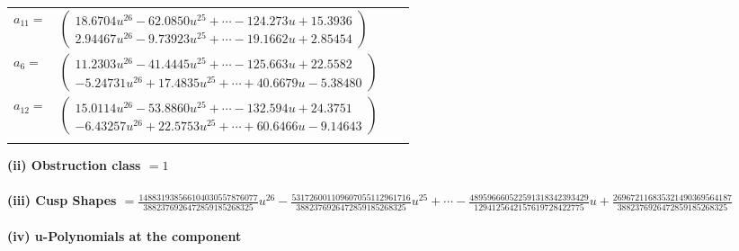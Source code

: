 \documentclass[1p]{elsarticle_modified}
\theoremstyle{definition}
\begin{document}
\begin{tabular}{m{7pt} m{180pt} m{7pt} m{180pt} }
\flushright $a_{11}=$&$\begin{pmatrix}18.6704 u^{26}-62.0850 u^{25}+\cdots-124.273 u+15.3936\\2.94467 u^{26}-9.73923 u^{25}+\cdots-19.1662 u+2.85454\end{pmatrix}$ \\
\flushright $a_{6}=$&$\begin{pmatrix}11.2303 u^{26}-41.4445 u^{25}+\cdots-125.663 u+22.5582\\-5.24731 u^{26}+17.4835 u^{25}+\cdots+40.6679 u-5.38480\end{pmatrix}$ \\
\flushright $a_{12}=$&$\begin{pmatrix}15.0114 u^{26}-53.8860 u^{25}+\cdots-132.594 u+24.3751\\-6.43257 u^{26}+22.5753 u^{25}+\cdots+60.6466 u-9.14643\end{pmatrix}$\\&\end{tabular}
\flushleft \textbf{(ii) Obstruction class $= 1$}\\~\\
\flushleft \textbf{(iii) Cusp Shapes $= \frac{148831938566104030557876077}{3882376926472859185268325} u^{26}-\frac{531726001109607055112961716}{3882376926472859185268325} u^{25}+\cdots-\frac{489596660522591318342393429}{1294125642157619728422775} u+\frac{269672116835321490369564187}{3882376926472859185268325}$}\\~\\
\newpage\renewcommand{\arraystretch}{1}
\flushleft \textbf{(iv) u-Polynomials at the component}\newline \\
\end{document}
